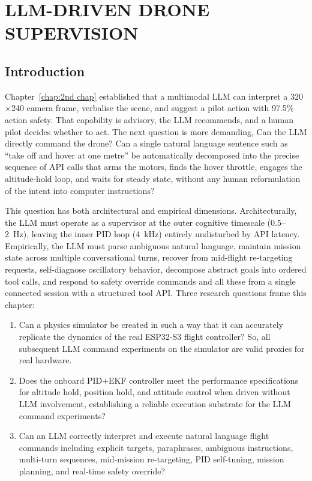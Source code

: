 ﻿\chapter{LLM-DRIVEN DRONE SUPERVISION}
\label{chap:3rd chap}

\section{Introduction}
\label{sec:ch3_intro}

Chapter~\ref{chap:2nd chap} established that a multimodal LLM can interpret a 320$\times$240 camera frame, verbalise the scene, and suggest a pilot action with 97.5\% action safety. 
That capability is advisory, the LLM recommends, and a human pilot decides whether to act. 
The next question is more demanding, Can the LLM directly command the drone? Can a single natural language sentence such as ``take off and hover at one metre'' be automatically decomposed into the precise sequence of API calls that arms the motors, finds the hover throttle, engages the altitude-hold loop, and waits for steady state, without any human reformulation of the intent into computer instructions?

This question has both architectural and empirical dimensions. Architecturally, the LLM must operate as a supervisor at the outer cognitive timescale (0.5--2~Hz), leaving the inner PID loop (4~kHz) entirely undisturbed by API latency. 
Empirically, the LLM must parse ambiguous natural language, maintain
mission state across multiple conversational turns, recover from mid-flight re-targeting requests, self-diagnose oscillatory behavior, decompose abstract goals into ordered tool calls, and respond to safety override commands and all these from a single connected session with a structured tool API. Three research questions frame this chapter:

\begin{enumerate}
  \item Can a physics simulator be created in such a way that it can accurately replicate the dynamics of the real ESP32-S3 flight controller?
 So, all subsequent LLM command experiments on the simulator are valid proxies for real hardware.
  \item Does the onboard PID+EKF controller meet the performance
  specifications for altitude hold, position hold, and attitude control when driven without LLM involvement, establishing a reliable execution substrate for the LLM command experiments?
  \item Can an LLM correctly interpret and execute natural language flight commands including explicit targets, paraphrases, ambiguous instructions, multi-turn sequences, mid-mission re-targeting, PID self-tuning, mission planning, and real-time safety override?
\end{enumerate}

